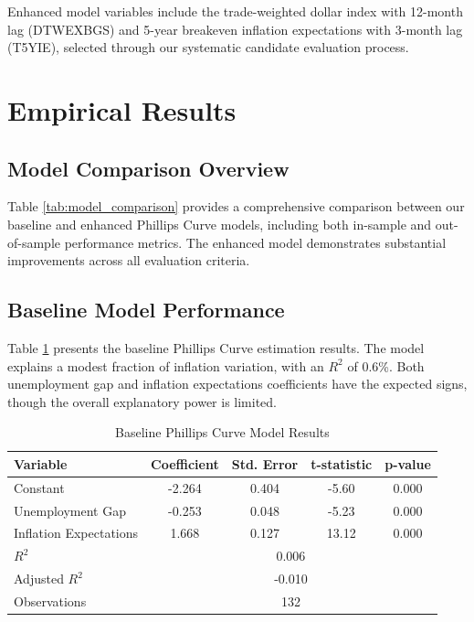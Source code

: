 \documentclass[12pt]{article}
\begin{document}
Enhanced model variables include the trade-weighted dollar index with 12-month lag (DTWEXBGS) and 5-year breakeven inflation expectations with 3-month lag (T5YIE), selected through our systematic candidate evaluation process.

\section{Empirical Results}

\subsection{Model Comparison Overview}

Table \ref{tab:model_comparison} provides a comprehensive comparison between our baseline and enhanced Phillips Curve models, including both in-sample and out-of-sample performance metrics. The enhanced model demonstrates substantial improvements across all evaluation criteria.



\subsection{Baseline Model Performance}

Table \ref{tab:baseline} presents the baseline Phillips Curve estimation results. The model explains a modest fraction of inflation variation, with an $R^2$ of 0.6\%. Both unemployment gap and inflation expectations coefficients have the expected signs, though the overall explanatory power is limited.

\begin{table}[H]
\centering
\caption{Baseline Phillips Curve Model Results}
\label{tab:baseline}
\begin{tabular}{lcccc}
\toprule
Variable & Coefficient & Std. Error & t-statistic & p-value \\
\midrule
Constant & -2.264 & 0.404 & -5.60 & 0.000 \\
Unemployment Gap & -0.253 & 0.048 & -5.23 & 0.000 \\
Inflation Expectations & 1.668 & 0.127 & 13.12 & 0.000 \\
\midrule
$R^2$ & \multicolumn{4}{c}{0.006} \\
Adjusted $R^2$ & \multicolumn{4}{c}{-0.010} \\
Observations & \multicolumn{4}{c}{132} \\
\bottomrule
\end{tabular}
\end{table}
\end{document}
